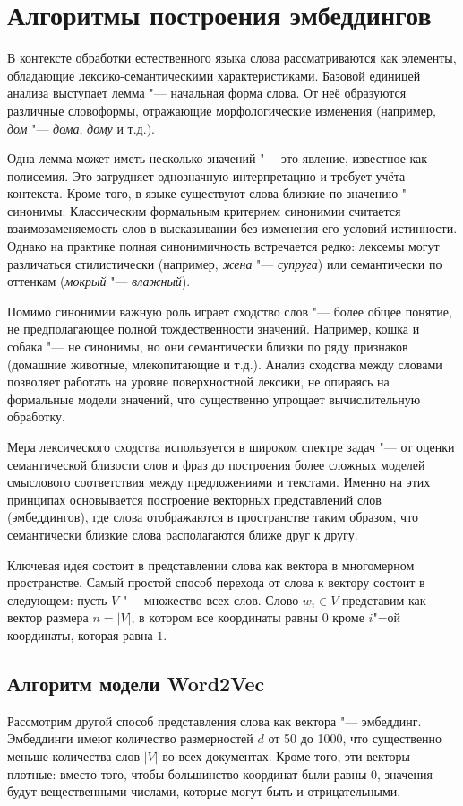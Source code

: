 \documentclass[coursework]{SCWorks}
\begin{document}
\section{Алгоритмы построения эмбеддингов}
В контексте обработки естественного языка слова рассматриваются как элементы, обладающие лексико-семантическими характеристиками. Базовой единицей анализа выступает лемма "--- начальная форма слова. От неё образуются различные словоформы, отражающие морфологические изменения (например, \textit{дом} "--- \textit{дома}, \textit{дому} и т.д.).

Одна лемма может иметь несколько значений "--- это явление, известное как полисемия. Это затрудняет однозначную интерпретацию и требует учёта контекста. Кроме того, в языке существуют слова близкие по значению "--- синонимы. Классическим формальным критерием синонимии считается взаимозаменяемость слов в высказывании без изменения его условий истинности. Однако на практике полная синонимичность встречается редко: лексемы могут различаться стилистически (например, \textit{жена} "--- \textit{супруга}) или семантически по оттенкам (\textit{мокрый} "--- \textit{влажный}).

Помимо синонимии важную роль играет сходство слов "--- более общее понятие, не предполагающее полной тождественности значений. Например, кошка и собака "--- не синонимы, но они семантически близки по ряду признаков (домашние животные, млекопитающие и т.д.). Анализ сходства между словами позволяет работать на уровне поверхностной лексики, не опираясь на формальные модели значений, что существенно упрощает вычислительную обработку.

Мера лексического сходства используется в широком спектре задач "--- от оценки семантической близости слов и фраз до построения более сложных моделей смыслового соответствия между предложениями и текстами. Именно на этих принципах основывается построение векторных представлений слов (эмбеддингов), где слова отображаются в пространстве таким образом, что семантически близкие слова располагаются ближе друг к другу.

Ключевая идея состоит в представлении слова как вектора в многомерном пространстве. Самый простой способ перехода от слова к вектору состоит в следующем: пусть $V$ "--- множество всех слов. Слово $w_i \in V$ представим как вектор размера $n = |V|$, в котором все координаты равны $0$ кроме $i$"=ой координаты, которая равна $1$\cite{jm3}.

\subsection{Алгоритм модели Word2Vec}
Рассмотрим другой способ представления слова как вектора "--- эмбеддинг. Эмбеддинги имеют количество размерностей $d$ от 50 до 1000, что существенно меньше количества слов $|V|$ во всех документах. Кроме того, эти векторы плотные: вместо того, чтобы большинство координат были равны 0, значения будут вещественными числами, которые могут быть и отрицательными\cite{wang2019evaluating}.
\end{document}
